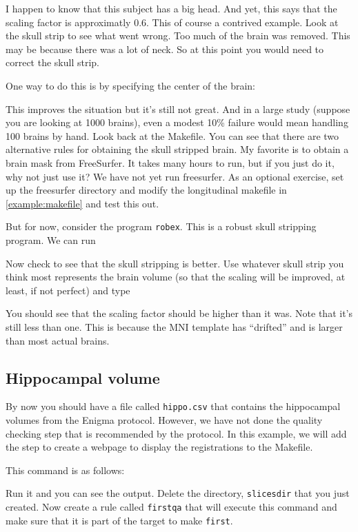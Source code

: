 I happen to know that this subject has a big head. And yet, this says
that the scaling factor is approximatly 0.6. This of course a
contrived example. Look at the skull strip to see what went wrong. Too
much of the brain was removed. This may be because there was a lot of neck.
So at this point you would need to correct the skull strip.

One way to do this is by specifying the center of the brain:

This improves the situation but it's still not great. And in a large
study (suppose you are looking at 1000 brains), even a modest 10\%
failure would mean handling 100 brains by hand.  Look back at the
Makefile. You can see that there are two alternative rules for
obtaining the skull stripped brain. My favorite is to obtain a brain
mask from FreeSurfer. It takes many hours to run, but if you just do
it, why not just use it? We have not yet run freesurfer. As an
optional exercise, set up the freesurfer directory and modify the
longitudinal makefile in \ref{example:makefile} and test this out.

But for now, consider the program \texttt{robex}. This is a robust
skull stripping program\cite{robex}. We can run

Now check to see that the skull stripping is better. Use whatever skull strip you think most represents the brain volume (so that the scaling will be improved, at least, if not perfect) and type 

You should see that the scaling factor should be higher than it
was. Note that it's still less than one. This is because the MNI
template has ``drifted'' and is larger than most actual brains. 

\subsection{Hippocampal volume}
By now you should have a file called \texttt{hippo.csv} that contains the hippocampal volumes from the Enigma protocol. However, we have not done the quality checking step that is recommended by the protocol. In this example, we will add the step to create a webpage to display the registrations to the Makefile.

This command is as follows:

Run it and you can see the output. Delete the directory, \texttt{slicesdir} that you just created. Now create a rule called \texttt{firstqa} that will execute this command and make sure that it is part of the target to make \texttt{first}.

